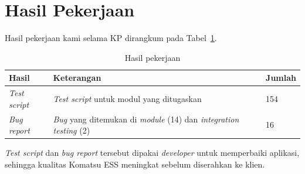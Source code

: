 \section{Hasil Pekerjaan}
Hasil pekerjaan kami selama KP dirangkum pada Tabel~\ref{tab:hasil-pekerjaan}.

\begin{table}[H]
\caption{Hasil pekerjaan}
\label{tab:hasil-pekerjaan}
\centering
\begin{tabularx}{\textwidth}{|p{4cm}|X|p{3cm}|}
\hline
\textbf{Hasil} & \textbf{Keterangan} & \textbf{Jumlah} \\
\hline
\textit{Test script} & \textit{Test script} untuk modul yang ditugaskan & 154 \\
\hline
\textit{Bug report} & \textit{Bug} yang ditemukan di \textit{module} (14) dan \textit{integration testing} (2) & 16 \\
\hline
\end{tabularx}
\end{table}

\textit{Test script} dan \textit{bug report} tersebut dipakai \textit{developer} untuk memperbaiki aplikasi, sehingga kualitas Komatsu ESS meningkat sebelum diserahkan ke klien. 

